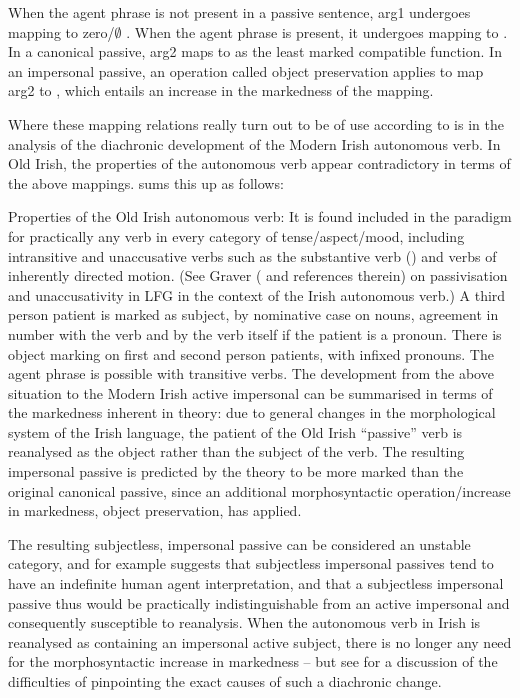 \documentclass[output=paper,colorlinks,citecolor=brown]{langscibook}
\begin{document}
When the agent phrase is not present in a passive sentence, arg1
undergoes mapping to zero/$\emptyset$ \citep[310]{bresnan2001lexical}. When the agent phrase is present, it undergoes mapping to {\OBLTHETA} \citep[17--19]{Kibort2007}. In a canonical passive, arg2 maps to \SUBJ as the least marked compatible function. In an impersonal passive, an operation called object preservation applies to map arg2 to \OBJ, which entails an increase in the markedness of the mapping.

Where these mapping relations really turn out to be of use according to \citet{Graver2010,Graver2011} is in the analysis of the diachronic development of the Modern Irish autonomous verb. In Old Irish, the properties of the autonomous verb appear contradictory in terms of the above mappings. \citet[179]{Graver2010} sums this up as follows:

\ea\label{ex:Celtic:19} Properties of the Old Irish autonomous verb:
\ea It is found included in the paradigm for practically any verb in every category of tense/aspect/mood, including intransitive and unaccusative verbs such as the substantive verb () and verbs of inherently directed motion. (See Graver (\citeyear[62--63]{Graver2010} and references therein) on passivisation and unaccusativity in LFG in the context of the Irish autonomous verb.)
\ex A third person patient is marked as subject, by nominative case on nouns, agreement in number with the verb and by the verb itself if the patient is a pronoun.
\ex There is object marking on first and second person patients, with infixed pronouns.
\ex The agent phrase is possible with transitive verbs.
\z\z
The development from the above situation to the Modern Irish active impersonal can be summarised in terms of the markedness inherent in  theory: due to general changes in the morphological system of the Irish language, the patient of the Old Irish ``passive'' verb is reanalysed as the object rather than the subject of the verb. The resulting impersonal passive is predicted by the theory to be more marked than the original canonical passive, since an additional morphosyntactic operation/increase in markedness, object preservation, has applied.

The resulting subjectless, impersonal passive can be considered an unstable category, and for example \citet[480--481 and references therein]{Blevins2003} suggests that subjectless impersonal passives tend to have an indefinite human agent interpretation, and that a subjectless impersonal passive thus would be practically indistinguishable from an active impersonal and consequently susceptible to reanalysis. When the autonomous verb in Irish is reanalysed as containing an impersonal active subject, there is no longer any need for the morphosyntactic increase in markedness -- but see \citet[200--203]{Graver2010} for a discussion of the difficulties of pinpointing the exact causes of such a diachronic change.
\end{document}
